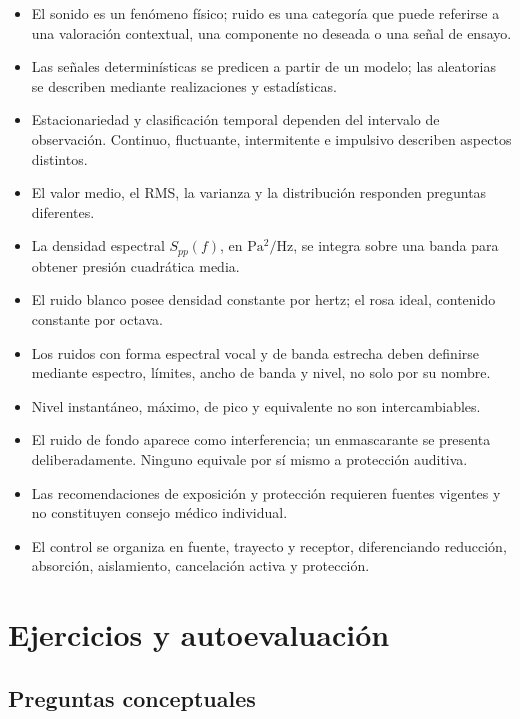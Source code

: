 \begin{itemize}
    \item El sonido es un fenómeno físico; ruido es una categoría que puede
    referirse a una valoración contextual, una componente no deseada o una
    señal de ensayo.
    \item Las señales determinísticas se predicen a partir de un modelo; las
    aleatorias se describen mediante realizaciones y estadísticas.
    \item Estacionariedad y clasificación temporal dependen del intervalo de
    observación. Continuo, fluctuante, intermitente e impulsivo describen
    aspectos distintos.
    \item El valor medio, el RMS, la varianza y la distribución responden
    preguntas diferentes.
    \item La densidad espectral \(S_{pp}(f)\), en
    \(\mathrm{Pa^2/Hz}\), se integra sobre una banda para obtener presión
    cuadrática media.
    \item El ruido blanco posee densidad constante por hertz; el rosa ideal,
    contenido constante por octava.
    \item Los ruidos con forma espectral vocal y de banda estrecha deben
    definirse mediante espectro, límites, ancho de banda y nivel, no solo por
    su nombre.
    \item Nivel instantáneo, máximo, de pico y equivalente no son
    intercambiables.
    \item El ruido de fondo aparece como interferencia; un enmascarante se
    presenta deliberadamente. Ninguno equivale por sí mismo a protección
    auditiva.
    \item Las recomendaciones de exposición y protección requieren fuentes
    vigentes y no constituyen consejo médico individual.
    \item El control se organiza en fuente, trayecto y receptor, diferenciando
    reducción, absorción, aislamiento, cancelación activa y protección.
\end{itemize}

\section{Ejercicios y autoevaluación}
\label{sec:u10-ejercicios}

\subsection*{Preguntas conceptuales}

